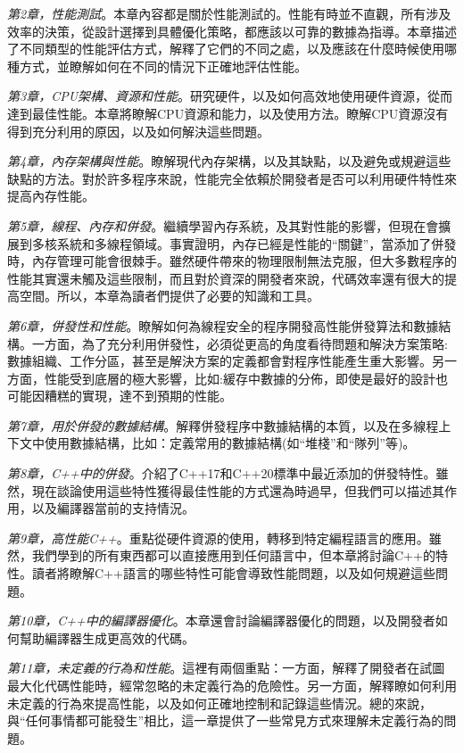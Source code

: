 \textit{第2章，性能測試}。本章內容都是關於性能測試的。性能有時並不直觀，所有涉及效率的決策，從設計選擇到具體優化策略，都應該以可靠的數據為指導。本章描述了不同類型的性能評估方式，解釋了它們的不同之處，以及應該在什麼時候使用哪種方式，並瞭解如何在不同的情況下正確地評估性能。

\textit{第3章，CPU架構、資源和性能}。研究硬件，以及如何高效地使用硬件資源，從而達到最佳性能。本章將瞭解CPU資源和能力，以及使用方法。瞭解CPU資源沒有得到充分利用的原因，以及如何解決這些問題。

\textit{第4章，內存架構與性能}。瞭解現代內存架構，以及其缺點，以及避免或規避這些缺點的方法。對於許多程序來說，性能完全依賴於開發者是否可以利用硬件特性來提高內存性能。

\textit{第5章，線程、內存和併發}。繼續學習內存系統，及其對性能的影響，但現在會擴展到多核系統和多線程領域。事實證明，內存已經是性能的“關鍵”，當添加了併發時，內存管理可能會很棘手。雖然硬件帶來的物理限制無法克服，但大多數程序的性能其實還未觸及這些限制，而且對於資深的開發者來說，代碼效率還有很大的提高空間。所以，本章為讀者們提供了必要的知識和工具。

\textit{第6章，併發性和性能}。瞭解如何為線程安全的程序開發高性能併發算法和數據結構。一方面，為了充分利用併發性，必須從更高的角度看待問題和解決方案策略:數據組織、工作分區，甚至是解決方案的定義都會對程序性能產生重大影響。另一方面，性能受到底層的極大影響，比如:緩存中數據的分佈，即使是最好的設計也可能因糟糕的實現，達不到預期的性能。

\textit{第7章，用於併發的數據結構}。解釋併發程序中數據結構的本質，以及在多線程上下文中使用數據結構，比如：定義常用的數據結構(如“堆棧”和“隊列”等)。

\textit{第8章，C++中的併發}。介紹了C++17和C++20標準中最近添加的併發特性。雖然，現在談論使用這些特性獲得最佳性能的方式還為時過早，但我們可以描述其作用，以及編譯器當前的支持情況。

\textit{第9章，高性能C++}。重點從硬件資源的使用，轉移到特定編程語言的應用。雖然，我們學到的所有東西都可以直接應用到任何語言中，但本章將討論C++的特性。讀者將瞭解C++語言的哪些特性可能會導致性能問題，以及如何規避這些問題。

\textit{第10章，C++中的編譯器優化}。本章還會討論編譯器優化的問題，以及開發者如何幫助編譯器生成更高效的代碼。

\textit{第11章，未定義的行為和性能}。這裡有兩個重點：一方面，解釋了開發者在試圖最大化代碼性能時，經常忽略的未定義行為的危險性。另一方面，解釋瞭如何利用未定義的行為來提高性能，以及如何正確地控制和記錄這些情況。總的來說，與“任何事情都可能發生”相比，這一章提供了一些常見方式來理解未定義行為的問題。

